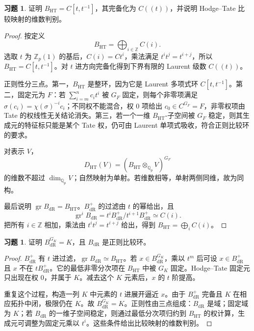 \documentclass[11pt,a4paper,openany]{ctexbook}
\numberwithin{equation}{chapter}
\newcommand{\Q}{\mathbb{Q}}
\newcommand{\Z}{\mathbb{Z}}
\theoremstyle{plain}
\theoremstyle{definition}
\newtheorem{exercise}[theorem]{习题}
\theoremstyle{remark}
\begin{document}
\begin{exercise}
证明 $B_{\mathrm{HT}}=C[t,t^{-1}]$，其完备化为 $C((t))$，并说明 Hodge--Tate 比较映射的维数判别。
\end{exercise}

\begin{proof}
按定义
\[
  B_{\mathrm{HT}}=\bigoplus_{i\in\Z}C(i).
\]
选取 $t$ 为 $\Z_p(1)$ 的基后，$C(i)=Ct^i$，乘法满足 $t^it^j=t^{i+j}$，所以 $B_{\mathrm{HT}}=C[t,t^{-1}]$。对 $t$ 进方向完备化得到下界有限的 Laurent 级数 $C((t))$。

正则性分三点。第一，$B_{\mathrm{HT}}$ 是整环，因为它是 Laurent 多项式环 $C[t,t^{-1}]$。第二，固定元为 $F$：若 $\sum_{i=m}^n c_it^i$ 被 $G_F$ 固定，则每个非零项满足 $\sigma(c_i)=\chi(\sigma)^{-i}c_i$；不同权不能混合，权 $0$ 项给出 $c_0\in C^{G_F}=F$，非零权项由 Tate 的权线性无关结论消失。第三，若一个一维 $B_{\mathrm{HT}}$-子空间被 $G_F$ 稳定，则其生成元的特征标只能是某个 Tate 权，仍可由 Laurent 单项式吸收，符合正则比较环的要求。

对表示 $V$，
\[
  D_{\mathrm{HT}}(V)=(B_{\mathrm{HT}}\otimes_{\Q_p}V)^{G_F}
\]
的维数不超过 $\dim_{\Q_p}V$；自然映射为单射。若维数相等，单射两侧同维，故为同构。

最后说明 $\operatorname{gr}B_{\mathrm{dR}}=B_{\mathrm{HT}}$。$B_{\mathrm{dR}}^+$ 的过滤由 $t$ 的幂给出，且
\[
  \operatorname{gr}^iB_{\mathrm{dR}}
  =t^iB_{\mathrm{dR}}^+/t^{i+1}B_{\mathrm{dR}}^+
  \simeq C(i).
\]
把所有 $i\in\Z$ 相加，乘法由 $t^it^j=t^{i+j}$ 给出，得到 $B_{\mathrm{HT}}=\bigoplus_iC(i)$。
\end{proof}

\begin{exercise}
证明 $B_{\mathrm{dR}}^{G_K}=K$，且 $B_{\mathrm{dR}}$ 是正则比较环。
\end{exercise}

\begin{proof}
$B_{\mathrm{dR}}^+$ 有 $t$ 进过滤，$\operatorname{gr}B_{\mathrm{dR}}\simeq B_{\mathrm{HT}}$。若 $x\in B_{\mathrm{dR}}^{G_K}$，乘以 $t^m$ 后可设 $x\in B_{\mathrm{dR}}^+$ 且 $x$ 不在 $tB_{\mathrm{dR}}^+$。它的最低非零分次项在 $B_{\mathrm{HT}}$ 中被 $G_K$ 固定。Hodge--Tate 固定元只出现在权 $0$，并属于 $K$。减去这个 $K$ 元素后，$x$ 的 $t$ 阶提高。

重复这个过程，构造一列 $K$ 中元素的 $t$ 进展开逼近 $x$。由于 $B_{\mathrm{dR}}^+$ 完备且 $K$ 在相应拓扑中闭，极限仍在 $K$。故 $B_{\mathrm{dR}}^{G_K}=K$。正则性由三点组成：$B_{\mathrm{dR}}$ 是域；固定域为 $K$；若 $B_{\mathrm{dR}}$ 的一维子空间稳定，则通过最低分次项归约到 $B_{\mathrm{HT}}$ 的权计算，生成元可调整为固定元乘以 $t^i$。这些条件给出比较映射的维数判别。
\end{proof}
\end{document}
